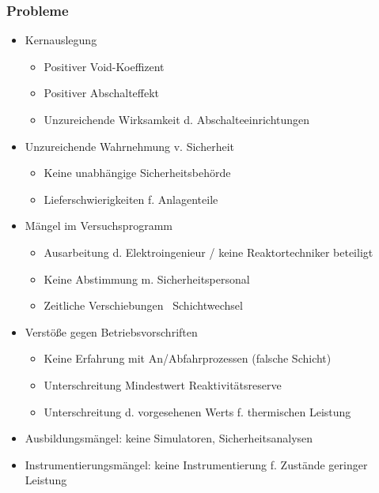 \documentclass[12pt]{article}
\begin{document}
\subsubsection{Probleme}
\begin{itemize}[noitemsep]
	\item Kernauslegung
		\begin{itemize}[noitemsep]
			\item Positiver Void-Koeffizent
			\item Positiver Abschalteffekt
			\item Unzureichende Wirksamkeit d. Abschalteeinrichtungen
		\end{itemize}
	\item Unzureichende Wahrnehmung v. Sicherheit
		\begin{itemize}[noitemsep]
			\item Keine unabhängige Sicherheitsbehörde
			\item Lieferschwierigkeiten f. Anlagenteile
		\end{itemize}
	\item Mängel im Versuchsprogramm
		\begin{itemize}[noitemsep]
			\item Ausarbeitung d. Elektroingenieur / keine Reaktortechniker beteiligt
			\item Keine Abstimmung m. Sicherheitspersonal
			\item Zeitliche Verschiebungen \textrightarrow\ Schichtwechsel
		\end{itemize}
	\item Verstöße gegen Betriebsvorschriften
		\begin{itemize}[noitemsep]
			\item Keine Erfahrung mit An/Abfahrprozessen (falsche Schicht)
			\item Unterschreitung Mindestwert Reaktivitätsreserve
			\item Unterschreitung d. vorgesehenen Werts f. thermischen Leistung
		\end{itemize}
	\item Ausbildungsmängel: keine Simulatoren, Sicherheitsanalysen
	\item Instrumentierungsmängel: keine Instrumentierung f. Zustände geringer Leistung
\end{itemize}
\end{document}
